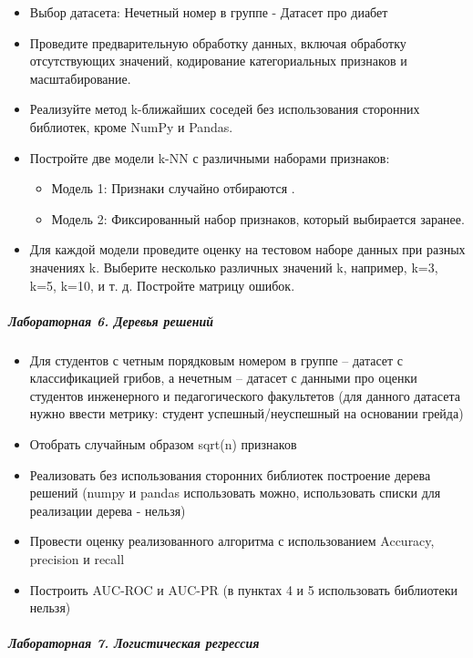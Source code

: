 \documentclass[12pt,onecolumn]{article}
\begin{document}
\begin{itemize}
  \item Выбор датасета: Нечетный номер в группе - Датасет про диабет
  \item Проведите предварительную обработку данных, включая обработку отсутствующих значений, кодирование категориальных признаков и масштабирование.
  \item Реализуйте метод k-ближайших соседей без использования сторонних библиотек, кроме NumPy и Pandas. 
  \item Постройте две модели k-NN с различными наборами признаков:
      \begin{itemize}
        \item Модель 1: Признаки случайно отбираются .
        \item Модель 2: Фиксированный набор признаков, который выбирается заранее.
      \end{itemize}
  \item Для каждой модели проведите оценку на тестовом наборе данных при разных значениях k. Выберите несколько различных значений k, например, k=3, k=5, k=10, и т. д. Постройте матрицу ошибок.
\end{itemize}
\subparagraph{Лабораторная 6. Деревья решений}
\begin{itemize}
  \item Для студентов с четным порядковым номером в группе – датасет с классификацией грибов, а нечетным – датасет с данными про оценки студентов инженерного и педагогического факультетов (для данного датасета нужно ввести метрику: студент успешный/неуспешный на основании грейда)
  \item Отобрать случайным образом sqrt(n) признаков
  \item Реализовать без использования сторонних библиотек построение дерева решений (numpy и pandas использовать можно, использовать списки для реализации  дерева - нельзя)
  \item Провести оценку реализованного алгоритма с использованием Accuracy, precision и recall
  \item Построить AUC-ROC и AUC-PR (в пунктах 4 и 5 использовать библиотеки нельзя)
\end{itemize}
\subparagraph{Лабораторная 7.  Логистическая регрессия}
\end{document}
